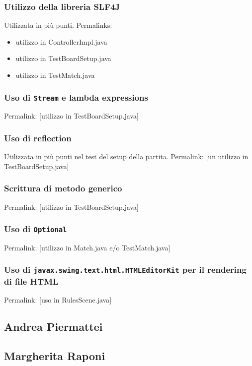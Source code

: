\documentclass[a4paper,12pt]{report}
\begin{document}
\subsubsection{Utilizzo della libreria SLF4J}
Utilizzata in più punti. Permalinks:
\begin{itemize}
	\item utilizzo in ControllerImpl.java
	\item utilizzo in TestBoardSetup.java
	\item utilizzo in TestMatch.java
\end{itemize}

\subsubsection{Uso di \texttt{Stream} e lambda expressions}
Permalink: [utilizzo in TestBoardSetup.java]

\subsubsection{Uso di reflection}
Utilizzata in più punti nel test del setup della partita.
Permalink: [un utilizzo in TestBoardSetup.java]

\subsubsection{Scrittura di metodo generico}
Permalink: [utilizzo in TestBoardSetup.java]

\subsubsection{Uso di \texttt{Optional}}
Permalink: [utilizzo in Match.java e/o TestMatch.java]

\subsubsection{Uso di \texttt{javax.swing.text.html.HTMLEditorKit} per il rendering di file HTML}
Permalink: [uso in RulesScene.java]

\subsection{Andrea Piermattei}

\subsection{Margherita Raponi}
\end{document}
